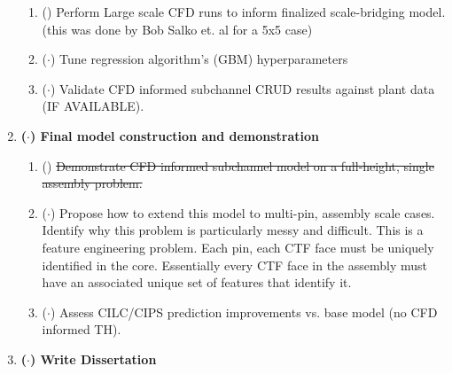 \begin{enumerate}
    \begin{enumerate}
        \item (\checkmark) Perform Large scale CFD runs to inform finalized scale-bridging model.  (this was done by Bob Salko et. al for a 5x5 case)
        \item ($\cdot$) Tune regression algorithm's (GBM) hyperparameters
        \item ($\cdot$) Validate CFD informed subchannel CRUD results against plant data (IF AVAILABLE).
    \end{enumerate}
\item \textbf{($\cdot$) Final model construction and demonstration}
    \begin{enumerate}
        \item (\xmark) \sout{Demonstrate CFD informed subchannel model on a full-height, single assembly problem.}
        \item ($\cdot$) Propose how to extend this model to multi-pin, assembly scale cases.  Identify why this problem is
                        particularly messy and difficult.  This is a feature engineering problem.  Each pin, each CTF face must be
                        uniquely identified in the core.  Essentially every CTF face in the assembly must have an associated unique
                        set of features that identify it.
        \item ($\cdot$) Assess CILC/CIPS prediction improvements vs. base model (no CFD informed TH).
    \end{enumerate}
\item \textbf{($\cdot$) Write Dissertation}
\end{enumerate}

